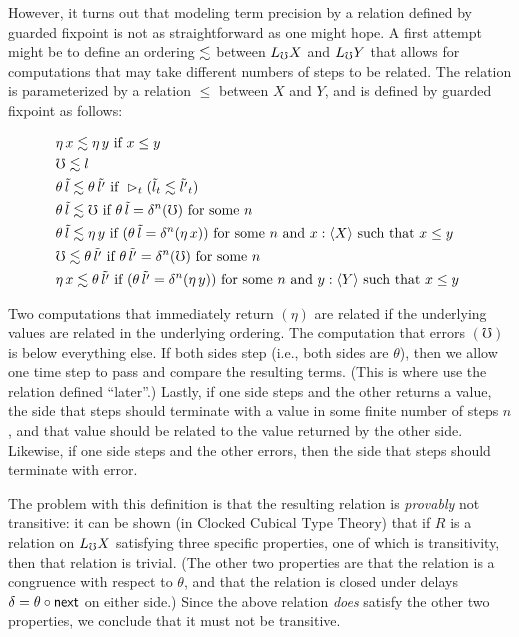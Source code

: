 However, it turns out that modeling term precision by a relation defined by guarded fixpoint
is not as straightforward as one might hope.
A first attempt might be to define an ordering $\lesssim$ between $L_\mho X$ and $L_\mho Y$
that allows for computations that may take different numbers of steps to be related.
The relation is parameterized by a relation $\le$ between $X$ and $Y$, and is defined
by guarded fixpoint as follows:

\begin{align*}
  &\eta\, x \semltbad \eta\, y \text{ if } 
    x \semlt y \\
%		
  &\mho \semltbad l \\
%
  &\theta\, \tilde{l} \semltbad \theta\, \tilde{l'} \text{ if } 
    \later_t (\tilde{l}_t \semltbad \tilde{l'}_t) \\
%	
  &\theta\, \tilde{l} \semltbad \mho \text{ if } 
    \theta\, \tilde{l} = \delta^n(\mho) \text { for some $n$ } \\
%	
  &\theta\, \tilde{l} \semltbad \eta\, y \text{ if }
    (\theta\, \tilde{l} = \delta^n(\eta\, x))
  \text { for some $n$ and $x : \ty{X}$ such that $x \le y$ } \\
%
  &\mho \semltbad \theta\, \tilde{l'} \text { if } 
    \theta\, \tilde{l'} = \delta^n(\mho) \text { for some $n$ } \\
%	
  &\eta\, x \semltbad \theta\, \tilde{l'} \text { if }
    (\theta\, \tilde{l'} = \delta^n (\eta\, y))
  \text { for some $n$ and $y : \ty{Y}$ such that $x \le y$ }
\end{align*}

Two computations that immediately return $(\eta)$ are related if the underlying
values are related in the underlying ordering. 
%
The computation that errors $(\mho)$ is below everything else.
%
If both sides step (i.e., both sides are $\theta$),
then we allow one time step to pass and compare the resulting terms.
(This is where use the relation defined ``later''.)
%
Lastly, if one side steps and the other returns a value, the side that steps should
terminate with a value in some finite number of steps $n$, and that value should
be related to the value returned by the other side.
Likewise, if one side steps and the other errors, then the side that steps
should terminate with error.

The problem with this definition is that the resulting relation is \emph{provably} not
transitive: it can be shown (in Clocked Cubical Type Theory) that if $R$ is a
relation on $L_\mho X$ satisfying three specific properties, one of which is
transitivity, then that relation is trivial.
(The other two properties are that the relation is a congruence with respect to $\theta$,
and that the relation is closed under delays $\delta = \theta \circ \mathsf{next}$ on either side.)
Since the above relation \emph{does} satisfy the other two properties, we conclude
that it must not be transitive.

